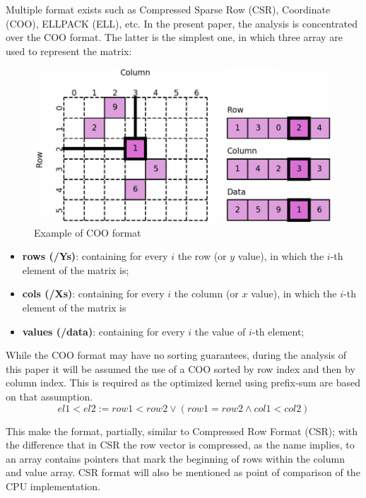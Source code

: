 \documentclass[conference]{IEEEtran}
\begin{document}
Multiple format exists such as Compressed Sparse Row (CSR), Coordinate (COO), ELLPACK (ELL), etc. In the present paper, the analysis is concentrated over the COO format. The latter is the simplest one, in which three array are used to represent the matrix:

\begin{figure}[h!]
	\centering
	\includegraphics[width=0.9\linewidth]{other_img/coo}
	\caption{Example of COO format}
	\label{fig:coo}
\end{figure}

\begin{itemize}
	\item \textbf{rows (/Ys)}: containing for every $i$ the row (or $y$ value), in which the $i$-th element of the matrix is;
	\item \textbf{cols (/Xs)}: containing for every $i$ the column (or $x$ value), in which the $i$-th element of the matrix is
	\item \textbf{values (/data)}: containing for every $i$ the value of $i$-th element;
\end{itemize}

While the COO format may have no sorting guarantees, during the analysis of this paper it will be assumed the use of a COO sorted by row index and then by column index. This is required as the optimized kernel using prefix-sum are based on that assumption.
\[el1 < el2 := row1 < row2 \lor (row1 = row2 \land col1 < col2) \]

This make the format, partially, similar to Compressed Row Format (CSR); with the difference that in CSR the row vector is compressed, as the name implies, to an array contains pointers that mark the beginning of rows within the column and value array. CSR format will also be mentioned as point of comparison of the CPU implementation.
\end{document}
